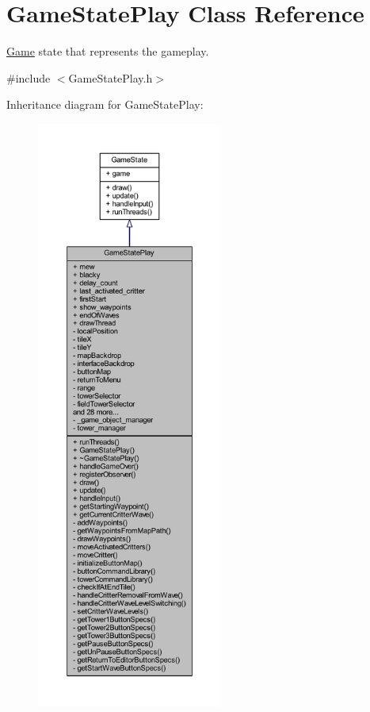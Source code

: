 \hypertarget{class_game_state_play}{\section{Game\+State\+Play Class Reference}
\label{class_game_state_play}
}


\hyperlink{class_game}{Game} state that represents the gameplay.  




{\ttfamily \#include $<$Game\+State\+Play.\+h$>$}



Inheritance diagram for Game\+State\+Play\+:\nopagebreak
\begin{figure}[H]
\begin{center}
\leavevmode
\includegraphics[height=550pt]{class_game_state_play__inherit__graph}
\end{center}
\end{figure}


